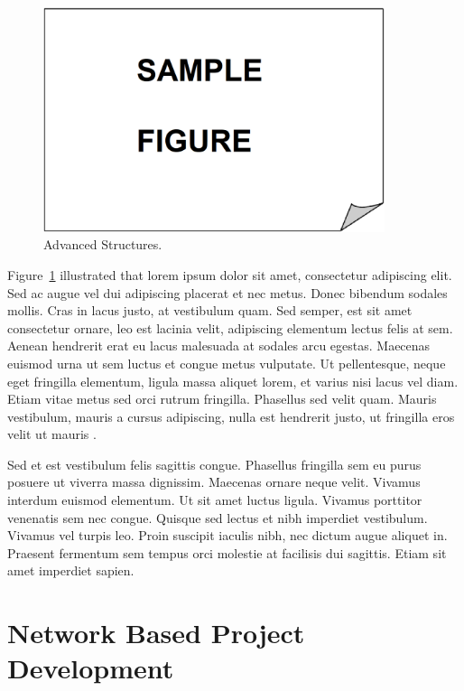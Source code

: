 \begin{figure}[!ht]
 \centering
 \includegraphics[width=10cm,keepaspectratio=true]{./fig/sekil2}
 \vspace*{4mm}
 \caption{Advanced Structures.}
 \label{fig:ch2-1}
\end{figure}

Figure~\ref{fig:ch2-1} illustrated that lorem ipsum dolor sit amet, consectetur adipiscing elit. Sed ac augue vel dui 
adipiscing placerat et nec metus. Donec bibendum sodales mollis. Cras in lacus 
justo, at vestibulum quam. Sed semper, est sit amet consectetur ornare, leo est 
lacinia velit, adipiscing elementum lectus felis at sem. Aenean hendrerit erat eu 
lacus malesuada at sodales arcu egestas. Maecenas euismod urna ut sem luctus et 
congue metus vulputate. Ut pellentesque, neque eget fringilla elementum, ligula 
massa aliquet lorem, et varius nisi lacus vel diam. Etiam vitae metus sed orci 
rutrum fringilla. Phasellus sed velit quam. Mauris vestibulum, mauris a cursus 
adipiscing, nulla est hendrerit justo, ut fringilla eros velit ut mauris 
\cite{Wegener2000629}.

Sed et est vestibulum felis sagittis congue. Phasellus fringilla sem eu purus 
posuere ut viverra massa dignissim. Maecenas ornare neque velit. Vivamus interdum 
euismod elementum. Ut sit amet luctus ligula. Vivamus porttitor venenatis sem nec 
congue. Quisque sed lectus et nibh imperdiet vestibulum. Vivamus vel turpis leo. 
Proin suscipit iaculis nibh, nec dictum augue aliquet in. Praesent fermentum sem 
tempus orci molestie at facilisis dui sagittis. Etiam sit amet imperdiet sapien. 

\section{Network Based Project Development}

